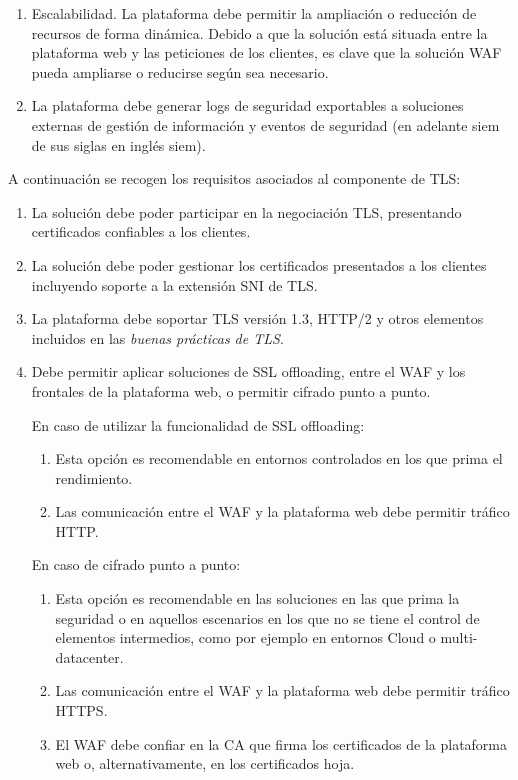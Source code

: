 \begin{enumerate}
  \item \label{req:escalado} Escalabilidad. La plataforma debe permitir la ampliación o reducción de recursos de forma dinámica. Debido a que la solución está situada entre la plataforma web y las peticiones de los clientes, es clave que la
    solución WAF pueda ampliarse o reducirse según sea necesario.

  \item La plataforma debe generar logs de seguridad exportables a soluciones externas de gestión de información y eventos de seguridad (en
    adelante \acrshort{siem} de sus siglas en inglés \acrlong{siem}).
\end{enumerate}

\par A continuación se recogen los requisitos asociados al componente de TLS:
\begin{enumerate}
  \item \label{req:tls} La solución debe poder participar en la negociación TLS, presentando certificados confiables a los clientes.

  \item La solución debe poder gestionar los certificados presentados a los clientes incluyendo soporte a la extensión \acrshort{SNI} de TLS.

  \item La plataforma debe soportar TLS versión 1.3, HTTP/2 y otros elementos incluidos en las {\em buenas prácticas de TLS\cite{TLSBestPractices}}.

  \item Debe permitir aplicar soluciones de SSL offloading, entre el WAF y los frontales de la plataforma web, o permitir cifrado punto a punto.
    \par En caso de utilizar la funcionalidad de SSL offloading:
      \begin{enumerate}[label=\emph{\alph*})]
        \item Esta opción es recomendable en entornos controlados en los que prima el rendimiento.
        \item Las comunicación entre el WAF y la plataforma web debe permitir tráfico HTTP.
      \end{enumerate}
    \par En caso de cifrado punto a punto:
      \begin{enumerate}[label=\emph{\alph*})]
        \item Esta opción es recomendable en las soluciones en las que prima la seguridad o en aquellos escenarios en los que no se tiene el control de
          elementos intermedios, como por ejemplo en entornos Cloud o multi-datacenter.
        \item Las comunicación entre el WAF y la plataforma web debe permitir tráfico HTTPS.
        \item El WAF debe confiar en la CA que firma los certificados de la plataforma web o, alternativamente, en los certificados hoja.
      \end{enumerate}
\end{enumerate}

